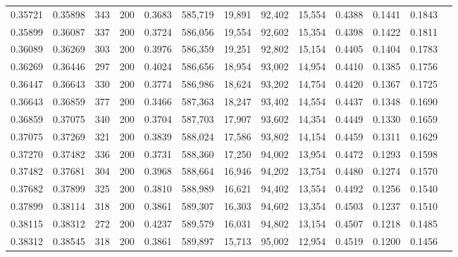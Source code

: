 \begin{tabular}{rrrrrrrrrrrrr}
0.35721 & 0.35898 &   343 & 200 &                                     0.3683 & 585,719 &  19,891 &  92,402 &  15,554 & 0.4388 & 0.1441 & 0.1843 \\
0.35899 & 0.36087 &   337 & 200 &                                     0.3724 & 586,056 &  19,554 &  92,602 &  15,354 & 0.4398 & 0.1422 & 0.1811 \\
0.36089 & 0.36269 &   303 & 200 &                                     0.3976 & 586,359 &  19,251 &  92,802 &  15,154 & 0.4405 & 0.1404 & 0.1783 \\
0.36269 & 0.36446 &   297 & 200 &                                     0.4024 & 586,656 &  18,954 &  93,002 &  14,954 & 0.4410 & 0.1385 & 0.1756 \\
0.36447 & 0.36643 &   330 & 200 &                                     0.3774 & 586,986 &  18,624 &  93,202 &  14,754 & 0.4420 & 0.1367 & 0.1725 \\
0.36643 & 0.36859 &   377 & 200 &                                     0.3466 & 587,363 &  18,247 &  93,402 &  14,554 & 0.4437 & 0.1348 & 0.1690 \\
0.36859 & 0.37075 &   340 & 200 &                                     0.3704 & 587,703 &  17,907 &  93,602 &  14,354 & 0.4449 & 0.1330 & 0.1659 \\
0.37075 & 0.37269 &   321 & 200 &                                     0.3839 & 588,024 &  17,586 &  93,802 &  14,154 & 0.4459 & 0.1311 & 0.1629 \\
0.37270 & 0.37482 &   336 & 200 &                                     0.3731 & 588,360 &  17,250 &  94,002 &  13,954 & 0.4472 & 0.1293 & 0.1598 \\
0.37482 & 0.37681 &   304 & 200 &                                     0.3968 & 588,664 &  16,946 &  94,202 &  13,754 & 0.4480 & 0.1274 & 0.1570 \\
0.37682 & 0.37899 &   325 & 200 &                                     0.3810 & 588,989 &  16,621 &  94,402 &  13,554 & 0.4492 & 0.1256 & 0.1540 \\
0.37899 & 0.38114 &   318 & 200 &                                     0.3861 & 589,307 &  16,303 &  94,602 &  13,354 & 0.4503 & 0.1237 & 0.1510 \\
0.38115 & 0.38312 &   272 & 200 &                                     0.4237 & 589,579 &  16,031 &  94,802 &  13,154 & 0.4507 & 0.1218 & 0.1485 \\
0.38312 & 0.38545 &   318 & 200 &                                     0.3861 & 589,897 &  15,713 &  95,002 &  12,954 & 0.4519 & 0.1200 & 0.1456 \\

\end{tabular}
